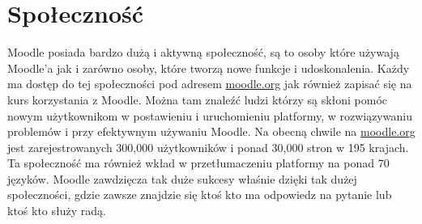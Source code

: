 \section{Społeczność} \label{roz:spolecznosc}
Moodle posiada bardzo dużą i aktywną społeczność, są to osoby które używają Moodle'a jak i zarówno osoby, które tworzą nowe funkcje i udoskonalenia. Każdy ma dostęp do tej społeczności pod adresem \href{http://moodle.org/}{moodle.org} jak również zapisać się na kurs korzystania z Moodle. Można tam znaleźć ludzi którzy są skłoni pomóc nowym użytkownikom w postawieniu i uruchomieniu platformy, w rozwiązywaniu problemów i przy efektywnym używaniu Moodle. Na obecną chwile na \href{http://moodle.org/}{moodle.org} jest zarejestrowanych 300,000 użytkowników i ponad 30,000 stron w 195 krajach. Ta społeczność ma również wkład w przetłumaczeniu platformy na ponad 70 języków. Moodle zawdzięcza tak duże sukcesy właśnie dzięki tak dużej społeczności, gdzie zawsze znajdzie się ktoś kto ma odpowiedz na pytanie lub ktoś kto służy radą. 
